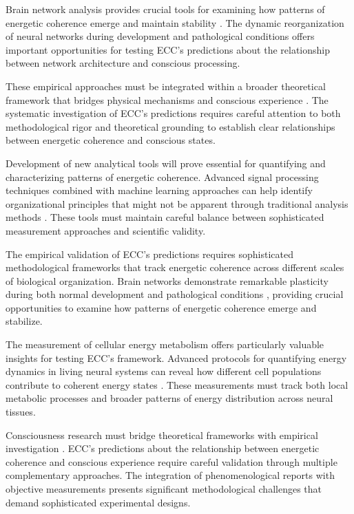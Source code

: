 Brain network analysis provides crucial tools for examining how patterns of energetic coherence emerge and maintain stability \cite{DePasquale2020}. The dynamic reorganization of neural networks during development and pathological conditions offers important opportunities for testing ECC's predictions about the relationship between network architecture and conscious processing.

These empirical approaches must be integrated within a broader theoretical framework that bridges physical mechanisms and conscious experience \cite{Northoff2020}. The systematic investigation of ECC's predictions requires careful attention to both methodological rigor and theoretical grounding to establish clear relationships between energetic coherence and conscious states.

Development of new analytical tools will prove essential for quantifying and characterizing patterns of energetic coherence. Advanced signal processing techniques combined with machine learning approaches can help identify organizational principles that might not be apparent through traditional analysis methods \cite{Buzsaki2019}. These tools must maintain careful balance between sophisticated measurement approaches and scientific validity.

The empirical validation of ECC's predictions requires sophisticated methodological frameworks that track energetic coherence across different scales of biological organization. Brain networks demonstrate remarkable plasticity during both normal development and pathological conditions \cite{Vertes2015}, providing crucial opportunities to examine how patterns of energetic coherence emerge and stabilize.

The measurement of cellular energy metabolism offers particularly valuable insights for testing ECC's framework. Advanced protocols for quantifying energy dynamics in living neural systems can reveal how different cell populations contribute to coherent energy states \cite{Zhang2019}. These measurements must track both local metabolic processes and broader patterns of energy distribution across neural tissues.

Consciousness research must bridge theoretical frameworks with empirical investigation \cite{Tononi2015}. ECC's predictions about the relationship between energetic coherence and conscious experience require careful validation through multiple complementary approaches. The integration of phenomenological reports with objective measurements presents significant methodological challenges that demand sophisticated experimental designs.

